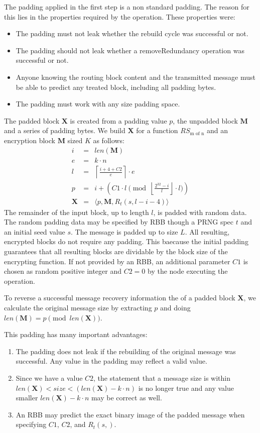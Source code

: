 \documentclass[acmsmall, screen]{acmart}
\begin{document}
The padding applied in the first step is a non standard padding. The reason for this lies in the properties required by the operation. These properties were:
\begin{itemize}
	\item The padding must not leak whether the rebuild cycle was successful or not.
	\item The padding should not leak whether a removeRedundancy operation was successful or not. 
	\item Anyone knowing the routing block content and the transmitted message must be able to predict any treated block, including all padding bytes.
	\item The padding must work with any size padding space.
\end{itemize}

The padded block $\mathbf{X}$ is created from a padding value $p$, the unpadded block $\mathbf{M}$ and a series of padding bytes. We build $\mathbf{X}$ for a function $RS_{\text{m of n}}$ and an encryption block $\mathbf{M}$ sized $K$ as follows:
\begin{eqnarray}
i          & = & len(\mathbf{M})\\
e          & = & k \cdot n\\
l          & = & \left\lceil\frac{i + 4 + C2 }{e}\right\rceil\cdot e\\
p          & = & i + \left( C1 \cdot l \pmod{\left\lfloor\frac{2^{32}-i}{l}\right\rfloor\cdot l}\right)\\
\mathbf{X} & = & \langle p,\mathbf{M},R_{t}\left(s,l-i-4\right)\rangle
\end{eqnarray}    
The remainder of the input block, up to length $l$, is padded with random data. The random padding data may be specified by RBB though a PRNG spec $t$ and an initial seed value $s$. The message is padded up to size $L$. All resulting, encrypted blocks do not require any padding. This baecause the initial padding guarantees that all resulting blocks are dividable by the block size of the encrypting function. If not provided by an RBB, an additional parameter $C1$ is chosen as random positive integer and $C2=0$  by the node executing the operation.

To reverse a successful message recovery information the of a padded block $\mathbf{X}$, we calculate the original message size by extracting $p$ and doing $len(\mathbf{M})=p \pmod{ len(\mathbf{X})}$.

This padding has many important advantages:
\begin{enumerate}
	\item The padding does not leak if the rebuilding of the original message was successful. Any value in the padding may reflect a valid value.
	\item Since we have a value $C2$, the statement that a message size is within $len(\mathbf{X})<size<(len(\mathbf{X})-k\cdot n)$ is no longer true and any value smaller $len(\mathbf{X})-k\cdot n$ may be correct as well.
	\item An RBB may predict the exact binary image of the padded message when specifying $C1$, $C2$, and $R_{t}(s,)$.
\end{enumerate}
\end{document}
